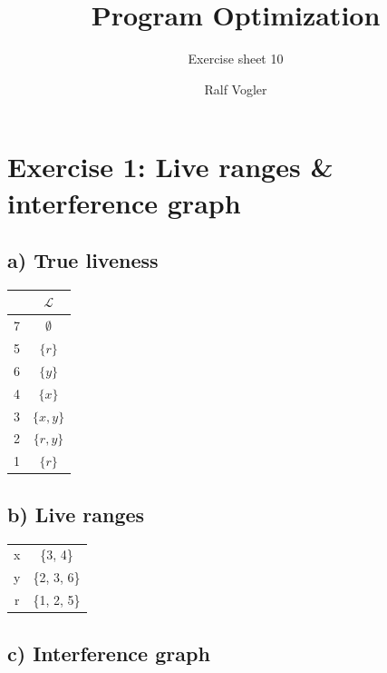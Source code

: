 \documentclass[11pt,a4paper]{scrartcl}
\begin{document}
\author{Ralf Vogler}
\title{Program Optimization}
\subtitle{Exercise sheet 10}

\maketitle

\section*{Exercise 1: Live ranges \& interference graph}
\begin{minipage}[t]{0.5\textwidth}
\subsection*{a) True liveness}
\begin{tabular}{|c|c|}
\hline
& $\mathcal{L}$ \\
\hline
7 & $\emptyset$ \\
5 & $\{r\}$ \\
6 & $\{y\}$ \\
4 & $\{x\}$ \\
3 & $\{x, y\}$ \\
2 & $\{r, y\}$ \\
1 & $\{r\}$ \\
\hline
\end{tabular}
\end{minipage}
\begin{minipage}[t]{0.5\textwidth}
\subsection*{b) Live ranges}
\begin{tabular}{|c|c|}
\hline
x & \{3, 4\} \\
y & \{2, 3, 6\} \\
r & \{1, 2, 5\} \\
\hline
\end{tabular}
\end{minipage}

\subsection*{c) Interference graph}
\end{document}
